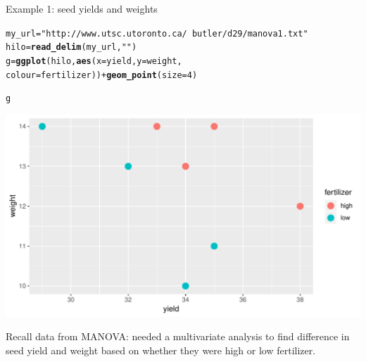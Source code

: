 \documentclass[unknownkeysallowed]{beamer}\usepackage[]{graphicx}\usepackage[]{color}
\makeatletter
\def\maxwidth{ %
  \ifdim\Gin@nat@width>\linewidth
    \linewidth
  \else
    \Gin@nat@width
  \fi
}
\newcommand{\hlnum}[1]{\textcolor[rgb]{0.686,0.059,0.569}{#1}}%
\newcommand{\hlstr}[1]{\textcolor[rgb]{0.192,0.494,0.8}{#1}}%
\newcommand{\hlopt}[1]{\textcolor[rgb]{0,0,0}{#1}}%
\newcommand{\hlstd}[1]{\textcolor[rgb]{0.345,0.345,0.345}{#1}}%
\newcommand{\hlkwb}[1]{\textcolor[rgb]{0.69,0.353,0.396}{#1}}%
\newcommand{\hlkwc}[1]{\textcolor[rgb]{0.333,0.667,0.333}{#1}}%
\newcommand{\hlkwd}[1]{\textcolor[rgb]{0.737,0.353,0.396}{\textbf{#1}}}%
\newenvironment{kframe}{%
 \def\at@end@of@kframe{}%
 \ifinner\ifhmode%
  \def\at@end@of@kframe{\end{minipage}}%
  \begin{minipage}{\columnwidth}%
 \fi\fi%
 \def\FrameCommand##1{\hskip\@totalleftmargin \hskip-\fboxsep
 \colorbox{shadecolor}{##1}\hskip-\fboxsep
     \hskip-\linewidth \hskip-\@totalleftmargin \hskip\columnwidth}%
 \MakeFramed {\advance\hsize-\width
   \@totalleftmargin\z@ \linewidth\hsize
   \@setminipage}}%
 {\par\unskip\endMakeFramed%
 \at@end@of@kframe}
\newenvironment{knitrout}{}{} %
\makeatother
\begin{document}
\begin{frame}[fragile]{Example 1: seed yields and weights}


\begin{knitrout}\small
{}\color{fgcolor}\begin{kframe}
\begin{alltt}
\hlstd{my_url}\hlkwb{=}\hlstr{"http://www.utsc.utoronto.ca/~butler/d29/manova1.txt"}
\hlstd{hilo}\hlkwb{=}\hlkwd{read_delim}\hlstd{(my_url,}\hlstr{" "}\hlstd{)}
\hlstd{g}\hlkwb{=}\hlkwd{ggplot}\hlstd{(hilo,}\hlkwd{aes}\hlstd{(}\hlkwc{x}\hlstd{=yield,}\hlkwc{y}\hlstd{=weight,}
  \hlkwc{colour}\hlstd{=fertilizer))}\hlopt{+}\hlkwd{geom_point}\hlstd{(}\hlkwc{size}\hlstd{=}\hlnum{4}\hlstd{)}
\end{alltt}
\end{kframe}
\end{knitrout}

\begin{minipage}[t]{0.6\linewidth}
\begin{knitrout}
\color{fgcolor}\begin{kframe}
\begin{alltt}
\hlstd{g}
\end{alltt}
\end{kframe}
\includegraphics[width=\maxwidth]{figure/berzani-1} 

\end{knitrout}
\end{minipage}
\begin{minipage}[t]{0.38\linewidth}
  \vspace{0.1\textheight}
  
  Recall data from MANOVA: needed a multivariate analysis to find
  difference in seed yield and weight based on whether they were high
  or low fertilizer.
\end{minipage}

  
\end{frame}
\end{document}
